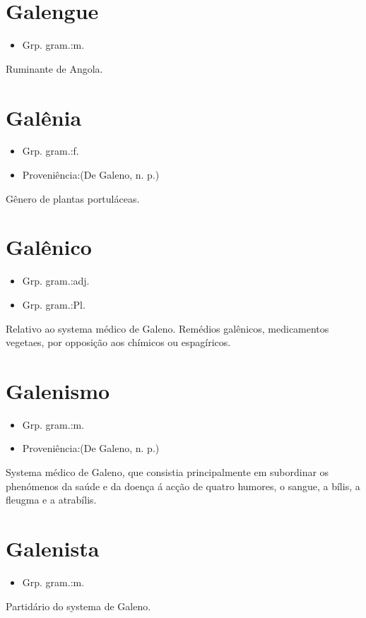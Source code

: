 \section{Galengue}
\begin{itemize}
\item {Grp. gram.:m.}
\end{itemize}
Ruminante de Angola.
\section{Galênia}
\begin{itemize}
\item {Grp. gram.:f.}
\end{itemize}
\begin{itemize}
\item {Proveniência:(De \textunderscore Galeno\textunderscore , n. p.)}
\end{itemize}
Gênero de plantas portuláceas.
\section{Galênico}
\begin{itemize}
\item {Grp. gram.:adj.}
\end{itemize}
\begin{itemize}
\item {Grp. gram.:Pl.}
\end{itemize}
Relativo ao systema médico de Galeno.
\textunderscore Remédios galênicos\textunderscore , medicamentos vegetaes, por opposição aos chímicos ou espagíricos.
\section{Galenismo}
\begin{itemize}
\item {Grp. gram.:m.}
\end{itemize}
\begin{itemize}
\item {Proveniência:(De \textunderscore Galeno\textunderscore , n. p.)}
\end{itemize}
Systema médico de Galeno, que consistia principalmente em subordinar os phenómenos da saúde e da doença á acção de quatro humores, o sangue, a bílis, a fleugma e a atrabílis.
\section{Galenista}
\begin{itemize}
\item {Grp. gram.:m.}
\end{itemize}
Partidário do systema de Galeno.

